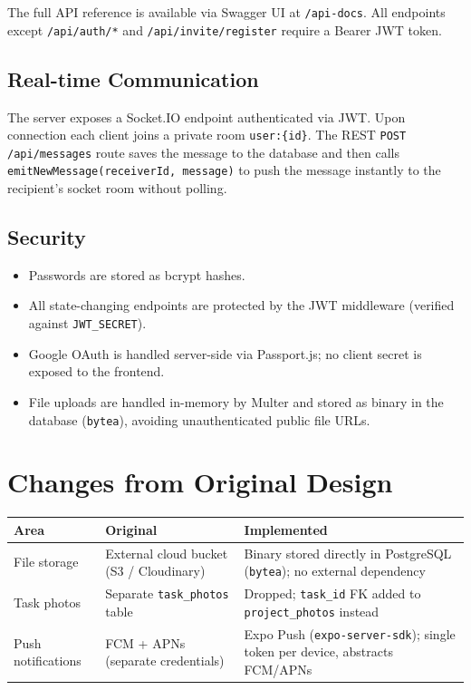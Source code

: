 \documentclass[12pt,a4paper]{article}
\begin{document}
The full API reference is available via Swagger UI at \texttt{/api-docs}. All endpoints except \texttt{/api/auth/*} and \texttt{/api/invite/register} require a Bearer JWT token.

\subsection{Real-time Communication}

The server exposes a Socket.IO endpoint authenticated via JWT. Upon connection each client joins a private room \texttt{user:\{id\}}. The REST \texttt{POST /api/messages} route saves the message to the database and then calls \texttt{emitNewMessage(receiverId, message)} to push the message instantly to the recipient's socket room without polling.

\subsection{Security}

\begin{itemize}[noitemsep]
    \item Passwords are stored as bcrypt hashes.
    \item All state-changing endpoints are protected by the JWT middleware (verified against \texttt{JWT\_SECRET}).
    \item Google OAuth is handled server-side via Passport.js; no client secret is exposed to the frontend.
    \item File uploads are handled in-memory by Multer and stored as binary in the database (\texttt{bytea}), avoiding unauthenticated public file URLs.
\end{itemize}

\section{Changes from Original Design}

\begin{tabularx}{\textwidth}{|l|X|X|}
\hline
\textbf{Area} & \textbf{Original} & \textbf{Implemented} \\
\hline
File storage & External cloud bucket (S3 / Cloudinary) & Binary stored directly in PostgreSQL (\texttt{bytea}); no external dependency \\
\hline
Task photos & Separate \texttt{task\_photos} table & Dropped; \texttt{task\_id} FK added to \texttt{project\_photos} instead \\
\hline
Push notifications & FCM + APNs (separate credentials) & Expo Push (\texttt{expo-server-sdk}); single token per device, abstracts FCM/APNs \\
\hline
\end{tabularx}
\end{document}
